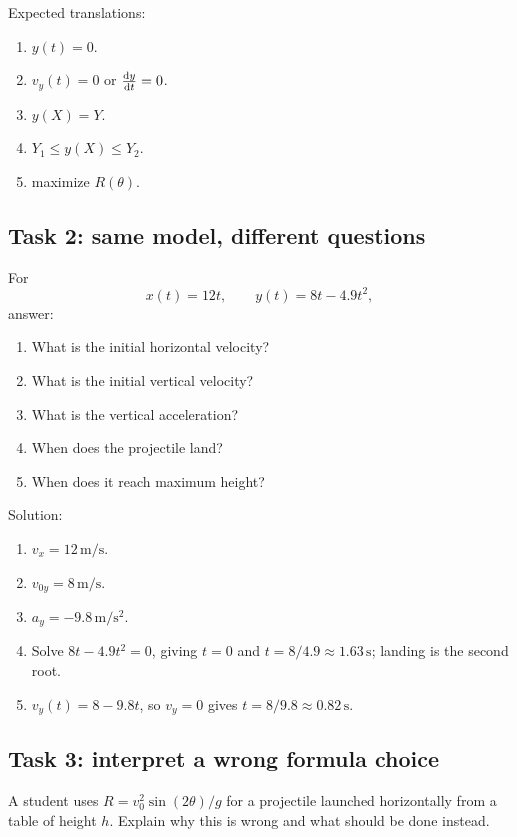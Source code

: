 \documentclass[11pt,a4paper]{article}
\begin{document}
Expected translations:
\begin{enumerate}
    \item $y(t)=0$.
    \item $v_y(t)=0$ or $\dv{y}{t}=0$.
    \item $y(X)=Y$.
    \item $Y_1\le y(X)\le Y_2$.
    \item maximize $R(\theta)$.
\end{enumerate}

\subsection*{Task 2: same model, different questions}

For
\[
x(t)=12t,
\qquad
 y(t)=8t-4.9t^2,
\]
answer:
\begin{enumerate}
    \item What is the initial horizontal velocity?
    \item What is the initial vertical velocity?
    \item What is the vertical acceleration?
    \item When does the projectile land?
    \item When does it reach maximum height?
\end{enumerate}

Solution:
\begin{enumerate}
    \item $v_x=12\,\mathrm{m/s}$.
    \item $v_{0y}=8\,\mathrm{m/s}$.
    \item $a_y=-9.8\,\mathrm{m/s^2}$.
    \item Solve $8t-4.9t^2=0$, giving $t=0$ and $t=8/4.9\approx1.63\,\mathrm{s}$; landing is the second root.
    \item $v_y(t)=8-9.8t$, so $v_y=0$ gives $t=8/9.8\approx0.82\,\mathrm{s}$.
\end{enumerate}

\subsection*{Task 3: interpret a wrong formula choice}

A student uses $R=v_0^2\sin(2\theta)/g$ for a projectile launched horizontally from a table of height $h$. Explain why this is wrong and what should be done instead.
\end{document}
